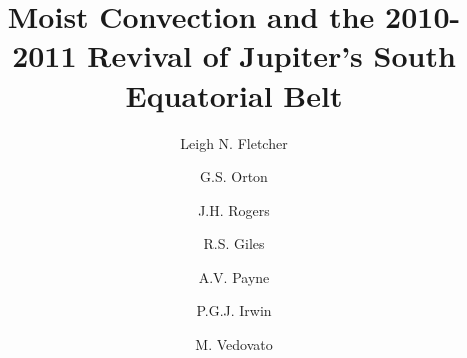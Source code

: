 \documentclass[final,authoryear,5p,times,twocolumn]{elsarticle}
\begin{document}
\begin{frontmatter}



\title{Moist Convection and the 2010-2011 Revival of Jupiter's South Equatorial Belt}


\author[le]{Leigh N. Fletcher}
\author[jpl]{G.S. Orton}
\author[jr]{J.H. Rogers}
\author[ox]{R.S. Giles}
\author[jpl]{A.V. Payne}
\author[ox]{P.G.J. Irwin}
\author[mv]{M. Vedovato}


%


\address[le]{Department of Physics \& Astronomy, University of Leicester, University Road, Leicester, LE1 7RH, UK}
\address[jpl]{Jet Propulsion Laboratory, California Institute of Technology, 4800 Oak Grove Drive, Pasadena, CA, 91109, USA}
\address[jr]{British Astronomical Association, Burlington House, Piccadilly, London  W1J 0DU, UK}
\address[ox]{Atmospheric, Oceanic \& Planetary Physics, Department of Physics, University of Oxford, Clarendon Laboratory, Parks Road, Oxford, OX1 3PU, UK}
\address[mv]{JUPOS Team, Unione Astrofili Italiani}


\end{frontmatter}
\end{document}
